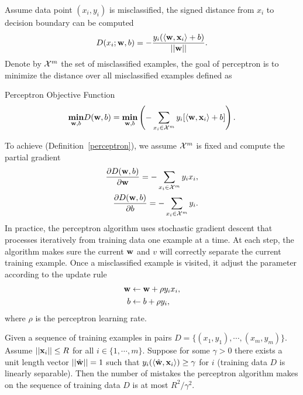 Assume data point $(x_i,y_i)$ is misclassified, the signed distance from $x_i$ to decision boundary can be computed 
\begin{align*}
	D(x_i;\mathbf {w},b) = -\frac{y_i(\langle \mathbf {w}, \mathbf {x}_i \rangle+b)}{\left|\left| \mathbf {w} \right|\right|}.
\end{align*}
Denote by $\mathcal{X}^m$ the set of misclassified examples, the goal of perceptron is to minimize the distance over all misclassified examples defined as
\begin{definition}{Perceptron Objective Function}\label{perceptron}
	\begin{align*}
		\underset{\mathbf {w},b}{\textbf{min}} D(\mathbf {w},b) = \underset{\mathbf {w},b}{\textbf{min}} \left( -\sum_{x_i\in\mathcal{X}^{m}}y_i[\langle \mathbf {w}, \mathbf {x}_i \rangle+b]\right).
	\end{align*}
\end{definition}
To achieve (Definition~\ref{perceptron}), we assume $\mathcal{X}^{m}$ is fixed and compute the partial gradient
\begin{align*}
	\frac{\partial D(\mathbf {w},b)}{\partial\mathbf {w}} = -\sum_{x_i\in\mathcal{X}^m}{y_ix_i},\\
	\frac{\partial D(\mathbf {w},b)}{\partial b} = -\sum_{x_i\in\mathcal{X}^m}{y_i}.
\end{align*}
In practice, the perceptron algorithm uses stochastic gradient descent that processes iteratively from training data one example at a time.
At each step, the algorithm makes sure the current $\mathbf {w}$ and $v$ will correctly separate the current training example. 
Once a misclassified example is visited, it adjust the parameter according to the update rule
\begin{align*}
	\mathbf {w} &\leftarrow \mathbf {w} + \rho y_i x_i,\\
	b &\leftarrow b + \rho y_i,
\end{align*}
where $\rho$ is the perceptron learning rate.
\begin{theory}{\citep{Block62,Novikoff62}}\label{perceptron_theory}
	Given a sequence of training examples in pairs $D=\{(x_1,y_1),\cdots,(x_m,y_m)\}$. 
	Assume $\left|\left| \mathbf {x}_i \right|\right|\le R$ for all $i\in\{1,\cdots,m\}$.
	Suppose for some $\gamma>0$ there exists a unit length vector $\left|\left| \hat{\mathbf {w}} \right|\right|=1$ such that $y_i(\langle \hat{\mathbf {w}}, \mathbf {x}_i \rangle)\ge\gamma$ for $i$ (training data $D$ is linearly separable).
	Then the number of mistakes the perceptron algorithm makes on the sequence of training data $D$ is at most ${R^2}/{\gamma^2}$.
\end{theory}
